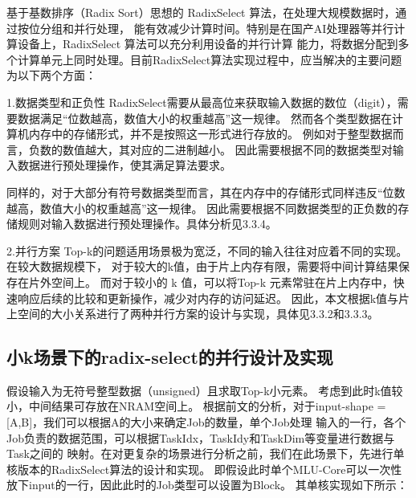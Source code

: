 基于基数排序（Radix Sort）思想的 RadixSelect 算法，在处理大规模数据时，通过按位分组和并行处理，
能有效减少计算时间。特别是在国产AI处理器等并行计算设备上，RadixSelect 算法可以充分利用设备的并行计算
能力，将数据分配到多个计算单元上同时处理。目前RadixSelect算法实现过程中，应当解决的主要问题为以下两个方面：

1.数据类型和正负性
    RadixSelect需要从最高位来获取输入数据的数位（digit），需要数据满足“位数越高，数值大小的权重越高”这一规律。
    然而各个类型数据在计算机内存中的存储形式，并不是按照这一形式进行存放的。
    例如对于整型数据而言，负数的数值越大，其对应的二进制越小。
    因此需要根据不同的数据类型对输入数据进行预处理操作，使其满足算法要求。
    
    同样的，对于大部分有符号数据类型而言，其在内存中的存储形式同样违反“位数越高，数值大小的权重越高”这一规律。
    因此需要根据不同数据类型的正负数的存储规则对输入数据进行预处理操作。具体分析见3.3.4。

2.并行方案
    Top-k的问题适用场景极为宽泛，不同的输入往往对应着不同的实现。在较大数据规模下，
    对于较大的k值，由于片上内存有限，需要将中间计算结果保存在片外空间上。
    而对于较小的 k 值，可以将Top-k 元素常驻在片上内存中，快速响应后续的比较和更新操作，减少对内存的访问延迟。
    因此，本文根据k值与片上空间的大小关系进行了两种并行方案的设计与实现，具体见3.3.2和3.3.3。



\subsection{小k场景下的radix-select的并行设计及实现}
假设输入为无符号整型数据（unsigned）且求取Top-k小元素。
考虑到此时k值较小，中间结果可存放在NRAM空间上。
  根据前文的分析，对于input-shape = [A,B]，我们可以根据A的大小来确定Job的数量，单个Job处理
  输入的一行，各个Job负责的数据范围，可以根据TaskIdx，TaskIdy和TaskDim等变量进行数据与Task之间的
  映射。在对更复杂的场景进行分析之前，我们在此场景下，先进行单核版本的RadixSelect算法的设计和实现。
  即假设此时单个MLU-Core可以一次性放下input的一行，因此此时的Job类型可以设置为Block。
  其单核实现如下所示：
